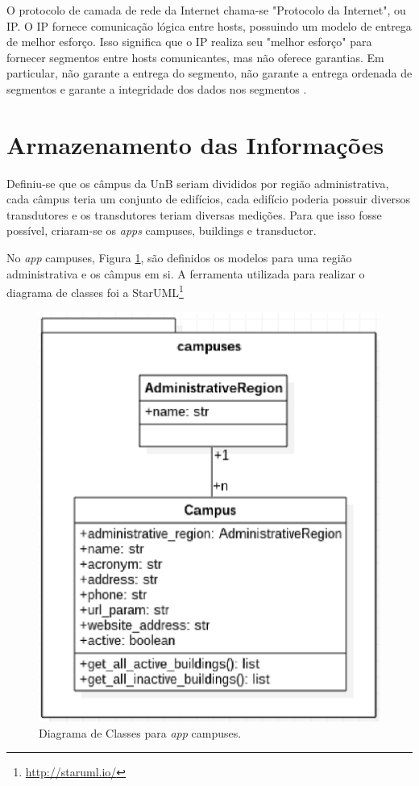     O protocolo de camada de rede da Internet chama-se "Protocolo da Internet", ou IP. O IP fornece comunicação lógica entre hosts, possuindo um modelo de entrega de melhor esforço. Isso significa que o IP realiza seu "melhor esforço" para fornecer segmentos entre hosts comunicantes, mas não oferece garantias. Em particular, não garante a entrega do segmento, não garante a entrega ordenada de segmentos e garante a integridade dos dados nos segmentos \cite{kurose_2002}.

\section{Armazenamento das Informações}
Definiu-se que os câmpus da UnB seriam divididos por região administrativa, cada câmpus teria um conjunto de edifícios, cada edifício poderia possuir diversos transdutores e os transdutores teriam diversas medições. Para que isso fosse possível, criaram-se os \textit{apps} campuses, buildings e transductor.

No \textit{app} campuses, Figura \ref{campuses}, são definidos os modelos para uma região administrativa e os câmpus em si. A ferramenta utilizada para realizar o diagrama de classes foi a StarUML\footnote{\url{http://staruml.io/}}

\begin{figure}[!h]
    \centering
    \includegraphics[keepaspectratio=true,scale=0.8]{figuras/campuses.eps}
    \caption{Diagrama de Classes para \textit{app} campuses.}
    \label{campuses}
\end{figure}

